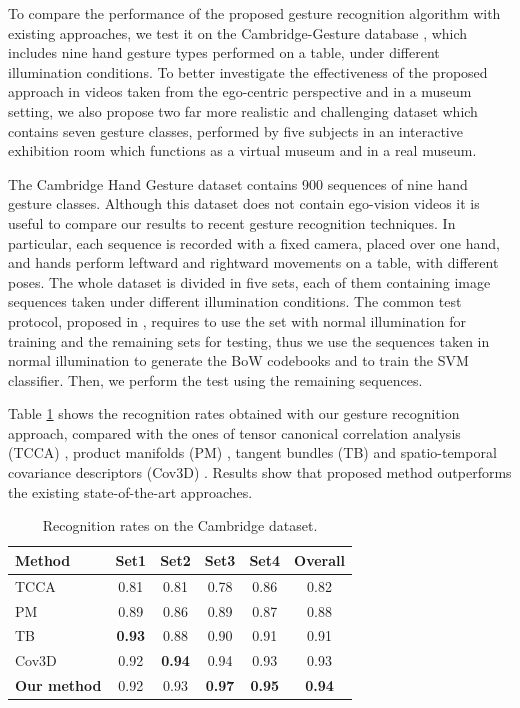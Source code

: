 To compare the performance of the proposed gesture recognition algorithm with existing approaches, we test it on the Cambridge-Gesture database \cite{kim2007tensor}, which includes nine hand gesture types performed on a table, under different illumination conditions. To better investigate the effectiveness of the proposed approach in videos taken from the ego-centric perspective and in a museum setting, we also propose two far more realistic and challenging dataset which contains seven gesture classes, performed by five subjects in an interactive exhibition room which functions as a virtual museum and in a real museum. 

The Cambridge Hand Gesture dataset contains 900 sequences of nine hand gesture classes. Although this dataset does not contain ego-vision videos it is useful to compare our results to recent gesture recognition techniques. In particular, each sequence is recorded with a fixed camera, placed over one hand, and hands perform leftward and rightward movements on a table, with different poses. The whole dataset is divided in five sets, each of them containing image sequences taken under different illumination conditions. The common test protocol, proposed in \cite{kim2007tensor}, requires to use the set with normal illumination for training and the remaining sets for testing, thus we use the sequences taken in normal illumination to generate the BoW codebooks and to train the SVM classifier. Then, we perform the test using the remaining sequences.   

Table \ref{cambridge} shows the recognition rates obtained with our gesture recognition approach, compared with the ones of tensor canonical correlation analysis (TCCA) \cite{kim2009canonical}, product manifolds (PM) \cite{lui2010action}, tangent bundles (TB) \cite{lui2011tangent} and spatio-temporal covariance descriptors (Cov3D) \cite{sanin2013spatio}. Results show that proposed method outperforms the existing state-of-the-art approaches.


\begin{table}
\begin{center}
\begin{tabular}{|l|c|c|c|c|c|}
\hline
Method					& Set1		& Set2		& Set3		& Set4	 	& Overall \\
\hline
\hline
TCCA \cite{kim2009canonical}		& 0.81		& 0.81		& 0.78		& 0.86		& 0.82 \\
PM \cite{lui2010action}			& 0.89		& 0.86		& 0.89		& 0.87		& 0.88  \\
TB \cite{lui2011tangent}			& \textbf{0.93}	& 0.88		& 0.90		& 0.91		& 0.91 \\
Cov3D \cite{sanin2013spatio}		& 0.92		&\textbf{0.94}	& 0.94		& 0.93		& 0.93 \\
\textbf{Our method}			& 0.92		& 0.93		& \textbf{0.97}	& \textbf{0.95}	& \textbf{0.94} \\
\hline
\end{tabular}
\end{center}
\caption{Recognition rates on the Cambridge dataset.}
\label{cambridge}
\end{table}


